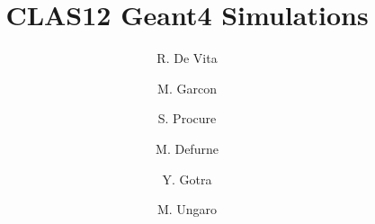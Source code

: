 \title{CLAS12 Geant4 Simulations}



\author[B]{R. De Vita}
\author[C]{M. Garcon}
\author[C]{S. Procure}
\author[C]{M. Defurne}
\author[A]{Y. Gotra}
\author[A]{M. Ungaro}

\address[A]{Thomas Jefferson National Accelerator Facility, Newport News, VA, USA}
\address[B]{Istituto Nazionale Di Fisica Nucleare, Genova, Italy}
